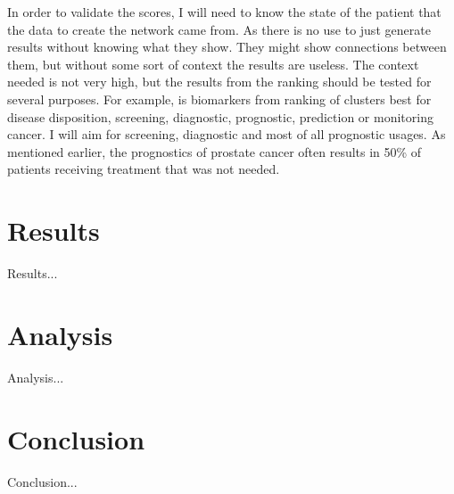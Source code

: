 \documentclass[UKenglish]{ifimaster}
\begin{document}
In order to validate the scores, I will need to know the state of the patient that the data to create the network came
from. As there is no use to just generate results without knowing what they show. They might show connections between
them, but without some sort of context the results are useless. The context needed is not very high, but the results
from the ranking should be tested for several purposes. For example, is biomarkers from ranking of clusters best for
disease disposition, screening, diagnostic, prognostic, prediction or monitoring cancer. I will aim for screening,
diagnostic and most of all prognostic usages. As mentioned earlier, the prognostics of prostate cancer often results in
50\% of patients receiving treatment that was not needed.

\part{Results}
Results...
\part{Analysis}
Analysis...
\part{Conclusion}
Conclusion...
\backmatter{}
\printbibliography
\end{document}
